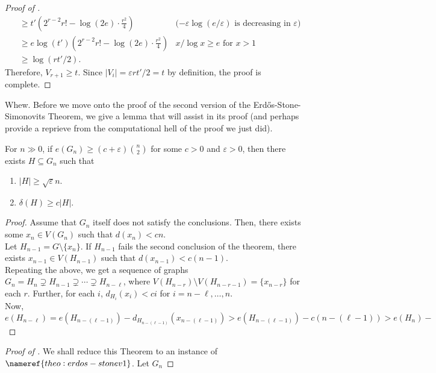\documentclass{article}
\begin{document}
\begin{proof}[Proof of ]
\begin{align*}
					&\ge t' \left( 2^{r-2} r! - \log(2e) \cdot \frac{r^2}{4} \right) & \text{($-\varepsilon \log(e/\varepsilon)$ is decreasing in $\varepsilon$)} \\
					&\ge e \log(t') \left(2^{r-2} r! - \log(2e) \cdot \frac{r^2}{4}\right) & \text{$x/\log x \ge e$ for $x>1$} \\
					&\ge \log(rt'/2).
				\end{align*}
				Therefore, $V_{r+1} \ge t$. Since $|V_i| = \varepsilon rt'/2 = t$ by definition, the proof is complete.
			\end{proof}

			Whew. Before we move onto the proof of the second version of the Erd\H{o}s-Stone-Simonovits Theorem, we give a lemma that will assist in its proof (and perhaps provide a reprieve from the computational hell of the proof we just did).

			\begin{flem}
				For $n\gg 0$, if $e(G_n) \ge (c+\varepsilon)\binom{n}{2}$ for some $c > 0$ and $\varepsilon > 0$, then there exists $H\subseteq G_n$ such that
				\begin{enumerate}
					\item $|H| \ge \sqrt{\varepsilon} n$.
					\item $\delta(H) \ge c|H|$.
				\end{enumerate}
			\end{flem}

			\begin{proof}
				Assume that $G_n$ itself does not satisfy the conclusions. Then, there exists some $x_n \in V(G_n)$ such that $d(x_n) < cn$.\\
				Let $H_{n-1} = G \setminus \{x_n\}$. If $H_{n-1}$ fails the second conclusion of the theorem, there exists $x_{n-1} \in V(H_{n-1})$ such that $d(x_{n-1}) < c (n-1)$.\\
				Repeating the above, we get a sequence of graphs $G_n = H_n \supsetneq H_{n-1} \supsetneq \cdots \supsetneq H_{n-\ell}$, where $V(H_{n-r}) \setminus V(H_{n-r-1}) = \{x_{n-r}\}$ for each $r$. Further, for each $i$, $d_{H_i}(x_i) < c i$ for $i = n-\ell,\ldots,n$.\\
				Now,
				\[ e(H_{n-\ell}) = e(H_{n-(\ell-1)}) - d_{H_{n-(\ell-1)}} (x_{n-(\ell-1)}) > e(H_{n-(\ell-1)}) - c(n-(\ell-1)) > e(H_n) -  \]
			\end{proof}


			\begin{proof}[Proof of ]
				We shall reduce this Theorem to an instance of $\nameref{theo: erdos-stone v1}$. Let $G_n$
			\end{proof}








\end{document}
